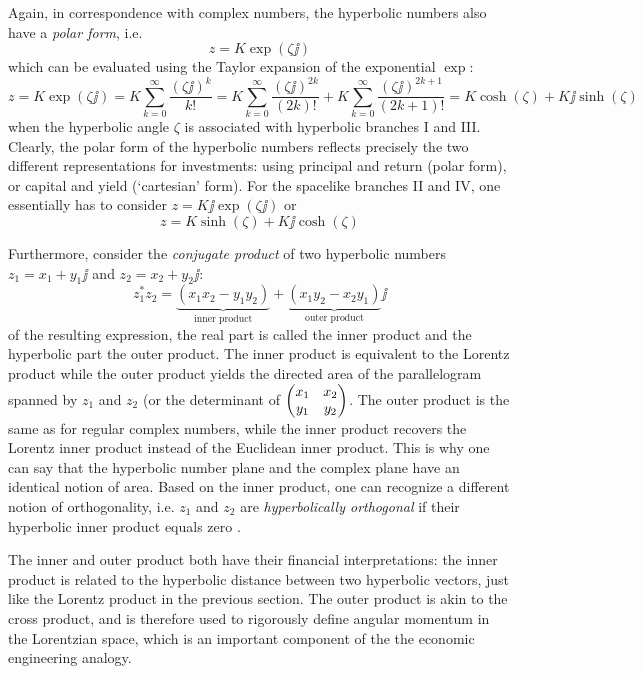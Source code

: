 Again, in correspondence with complex numbers, the hyperbolic numbers also have a  \emph{polar form}, i.e.
\[
     z = K \exp(\zeta \jj)
\]
which can be evaluated using the Taylor expansion of the exponential \(\exp\):
\[
     z = K\exp(\zeta \jj) = K \sum^\infty_{k = 0} \frac{(\zeta \jj)^k}{k!} =  K \sum^\infty_{k = 0} \frac{(\zeta \jj)^{2k}}{(2k)!} + K \sum^\infty_{k = 0} \frac{(\zeta \jj)^{2k+1}}{(2k + 1)!} = K\cosh(\zeta) + K\jj\sinh(\zeta)
\]
when the hyperbolic angle \(\zeta\) is associated with hyperbolic branches I and III. Clearly, the polar form of the hyperbolic numbers reflects precisely the two different representations for investments: using principal and return (polar form), or capital and yield (`cartesian' form). For the spacelike branches II and IV, one essentially has to consider \(z = K\jj\exp(\zeta\jj)\) or
\[
     z = K\sinh(\zeta) + K\jj\cosh(\zeta)
\]

Furthermore, consider the \emph{conjugate product} of two hyperbolic numbers \(z_1 = x_1 + y_1\jj\) and \(z_2 = x_2 + y_2\jj\):
\[
     z_1^*z_2 = \underbrace{(x_1x_2 - y_1y_2)}_\text{inner product} 
            + \underbrace{(x_1y_2 - x_2y_1)}_\text{outer product}\jj
\]
of the resulting expression, the real part is called the inner product and the hyperbolic part the outer product. The inner product is equivalent to the Lorentz product while the outer product yields the directed area of the parallelogram spanned by \(z_1\) and \(z_2\) (or the determinant of \(\mqty(x_1 & x_2\\y_1&y_2)\). The outer product is the same as for regular complex numbers, while the inner product recovers the Lorentz inner product instead of the Euclidean inner product. This is why one can say that the hyperbolic number plane and the complex plane have an identical notion of area. Based on the inner product, one can recognize a different notion of orthogonality, i.e. \(z_1\) and \(z_2\) are \emph{hyperbolically orthogonal} if their hyperbolic inner product equals zero \cite{Needham1997, Sobczyk1995}.

The inner and outer product both have their financial interpretations: the inner product is related to the hyperbolic distance between two hyperbolic vectors, just like the Lorentz product in the previous section. The outer product is akin to the cross product, and is therefore used to rigorously define angular momentum in the Lorentzian space, which is an important component of the the economic engineering analogy.

